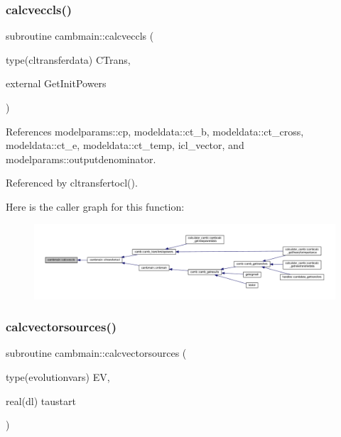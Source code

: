 \subsubsection{\texorpdfstring{calcveccls()}{calcveccls()}}
{\footnotesize\ttfamily subroutine cambmain\+::calcveccls (\begin{DoxyParamCaption}\item[{type(cltransferdata)}]{C\+Trans,  }\item[{external}]{Get\+Init\+Powers }\end{DoxyParamCaption})\hspace{0.3cm}{\ttfamily [private]}}



References modelparams\+::cp, modeldata\+::ct\+\_\+b, modeldata\+::ct\+\_\+cross, modeldata\+::ct\+\_\+e, modeldata\+::ct\+\_\+temp, icl\+\_\+vector, and modelparams\+::outputdenominator.



Referenced by cltransfertocl().

Here is the caller graph for this function\+:
\nopagebreak
\begin{figure}[H]
\begin{center}
\leavevmode
\includegraphics[width=350pt]{namespacecambmain_a709092859c794b6298b580be81ff9a90_icgraph}
\end{center}
\end{figure}
\mbox{\label{namespacecambmain_affd6aea4c80363ff01132e154eabbb00}} 
\subsubsection{\texorpdfstring{calcvectorsources()}{calcvectorsources()}}
{\footnotesize\ttfamily subroutine cambmain\+::calcvectorsources (\begin{DoxyParamCaption}\item[{type(evolutionvars)}]{EV,  }\item[{real(dl)}]{taustart }\end{DoxyParamCaption})\hspace{0.3cm}{\ttfamily [private]}}



